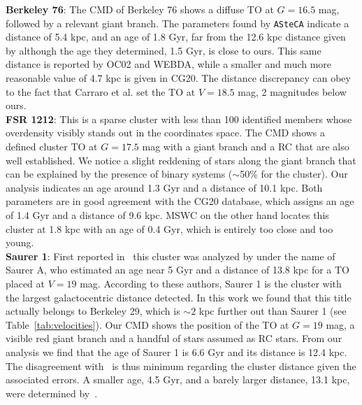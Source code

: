 \documentclass[referee]{aa}
\begin{document}
\begin{appendix}
  \noindent \textbf{Berkeley 76}: The CMD of Berkeley 76 shows a diffuse TO at $G=16.5$
  mag, followed by a relevant giant branch. The parameters found by
  \texttt{ASteCA} indicate a distance of 5.4 kpc, and an age of 1.8 Gyr, far
  from the 12.6 kpc distance given
  by \cite{Carraro_2013_Five} although the age they determined, 1.5 Gyr, is
  close to ours. This same distance is reported by OC02 and WEBDA, while a
  smaller and much more reasonable value of 4.7 kpc is given in CG20.
  The distance discrepancy can obey to the fact that Carraro et al. set
  the TO at $V=18.5$ mag, 2 magnitudes below ours.\\

  \noindent \textbf{FSR 1212}: This is a sparse cluster with less than 100 identified 
  members whose overdensity visibly stands out in the coordinates space. The CMD
  shows a defined cluster TO at $G=17.5$ mag with a giant branch and a RC that
  are also well established. We notice a slight reddening of stars along the
  giant branch that can be explained by the presence of binary systems 
  ($\sim$50\% for the cluster).
  Our analysis indicates an age around 1.3 Gyr and a distance of 10.1
  kpc. Both parameters are in good agreement with the CG20 database, which
  assigns an age of 1.4 Gyr and a distance of 9.6 kpc. MSWC on the other hand
  locates this cluster at 1.8 kpc with an age of 0.4 Gyr, which is entirely too
  close and too young.\\

  \noindent \textbf{Saurer 1}: First reported in~\citet[][along with Saurer 3 and Saurer 6]
  {Saurer_1994} this cluster was analyzed by \cite{Carraro_2003} under
  the name of Saurer A, who estimated an age near 5 Gyr and a distance of 13.8
  kpc for a TO placed at $V=19$ mag. According to these authors, Saurer 1 is the
  cluster with the largest galactocentric distance detected. In this work we
  found that this title actually belongs to Berkeley 29, which is $\sim2$
  kpc further out than Saurer 1 (see Table~\ref{tab:velocities}).
  Our CMD shows the position of the TO at $G=19$ mag, a visible red giant
  branch and a handful of stars assumed as RC stars. From our analysis we find
  that the age of Saurer 1 is 6.6 Gyr and its distance is 12.4 kpc. The
  disagreement with~\cite{Carraro_2003} is thus minimum regarding the
  cluster distance given the associated errors. A smaller age, 4.5 Gyr, and
  a barely larger distance, 13.1 kpc, were determined
  by~\cite{Frinchaboy_2006}.\\


\end{appendix}
\end{document}
